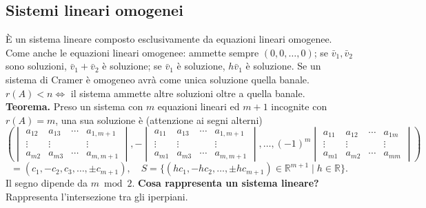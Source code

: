 \documentclass[11pt,a4paper]{article}
\newcommand{\pagina}[1]{\clearpage}
\begin{document}
\subsection*{Sistemi lineari omogenei}
È un sistema lineare composto esclusivamente da equazioni lineari omogenee. Come anche le equazioni lineari omogenee: ammette sempre $(0,0,\ldots,0)$; se $\bar v_1,\bar v_2$ sono soluzioni, $\bar v_1+\bar v_2$ è soluzione; se $\bar v_1$ è soluzione, $h\bar v_1$ è soluzione.
Se un sistema di Cramer è omogeneo avrà come unica soluzione quella banale. $r(A)<n\Longleftrightarrow$ il sistema ammette altre soluzioni oltre a quella banale.
\textbf{Teorema.} Preso un sistema con $m$ equazioni lineari ed $m+1$ incognite con $r(A)=m$, una sua soluzione è (attenzione ai segni alterni)
\[\left(\begin{vmatrix}a_{12}&a_{13}&\cdots&a_{1,m+1}\\\vdots&\vdots&&\vdots\\a_{m2}&a_{m3}&\cdots&a_{m,m+1}\end{vmatrix},-\begin{vmatrix}a_{11}&a_{13}&\cdots&a_{1,m+1}\\\vdots&\vdots&&\vdots\\a_{m1}&a_{m3}&\cdots&a_{m,m+1}\end{vmatrix},\ldots,(-1)^m\begin{vmatrix}a_{11}&a_{12}&\cdots&a_{1m}\\\vdots&\vdots&&\vdots\\a_{m1}&a_{m2}&\cdots&a_{mm}\end{vmatrix}\right)\]
\[=(c_1,-c_2,c_3,\ldots,\pm c_{m+1}),\quad S=\{(hc_1,-hc_2,\ldots,\pm hc_{m+1})\in\mathbb R^{m+1}\mid h\in\mathbb R\}.\]
Il segno dipende da $m\bmod2$.
\textbf{Cosa rappresenta un sistema lineare?} Rappresenta l'intersezione tra gli iperpiani.
\pagina{28}
\end{document}
